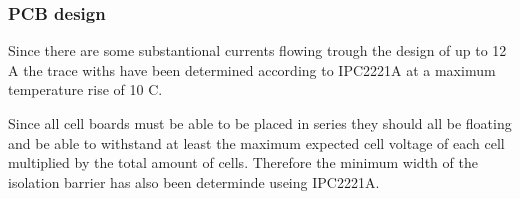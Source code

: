 \subsubsection{PCB design}
Since there are some substantional currents flowing trough the design of up to 12 A the trace withs have been determined according to IPC2221A at a maximum temperature rise of 10 \textdegree C.

Since all cell boards must be able to be placed in series they should all be floating and be able to withstand at least the maximum expected cell voltage of each cell multiplied by the total amount of cells. Therefore the minimum width of the isolation barrier has also been determinde useing IPC2221A.